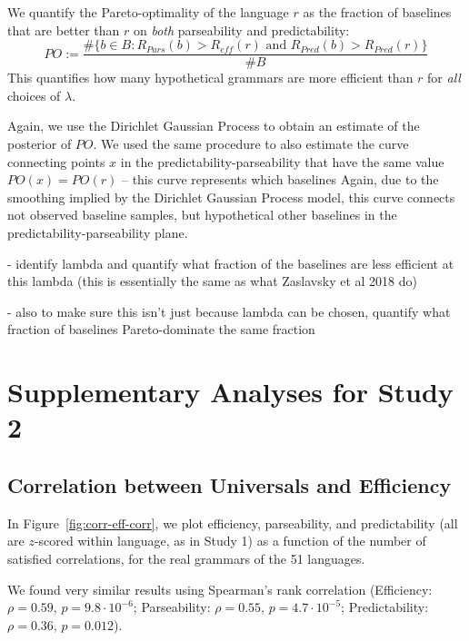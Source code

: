 \documentclass[10pt,twoside,lineno]{article}
\begin{document}
We quantify the Pareto-optimality of the language $r$ as the fraction of baselines that are better than $r$ on \emph{both} parseability and predictability:
\begin{equation}
	PO := \frac{\# \{b \in B: R_{Pars}(b) > R_{eff}(r) \text{ and }  R_{Pred}(b) > R_{Pred}(r) \}}{\#B}
\end{equation}
This quantifies how many hypothetical grammars are more efficient than $r$ for \emph{all} choices of $\lambda$.

Again, we use the Dirichlet Gaussian Process to obtain an estimate of the posterior of $PO$.
We used the same procedure to also estimate the curve connecting points $x$ in the predictability-parseability that have the same value $PO(x) = PO(r)$ -- this curve represents which baselines 
Again, due to the smoothing implied by the Dirichlet Gaussian Process model, this curve connects not observed baseline samples, but hypothetical other baselines in the predictability-parseability plane.


- identify lambda and quantify what fraction of the baselines are less efficient at this lambda (this is essentially the same as what Zaslavsky et al 2018 do)

- also to make sure this isn't just because lambda can be chosen, quantify what fraction of baselines Pareto-dominate the same fraction







\section{Supplementary Analyses for Study 2}
\subsection{Correlation between Universals and Efficiency}

In Figure~\ref{fig:corr-eff-corr}, we plot efficiency, parseability, and predictability (all are $z$-scored within language, as in Study 1) as a function of the number of satisfied correlations, for the real grammars of the 51 languages.

We found very similar results using Spearman's rank correlation (Efficiency: $\rho=0.59$, $p = 9.8 \cdot 10^{-6}$; Parseability: $\rho=0.55$, $p=4.7 \cdot 10^{-5}$; Predictability: $\rho=0.36$, $p=0.012$).
\end{document}
